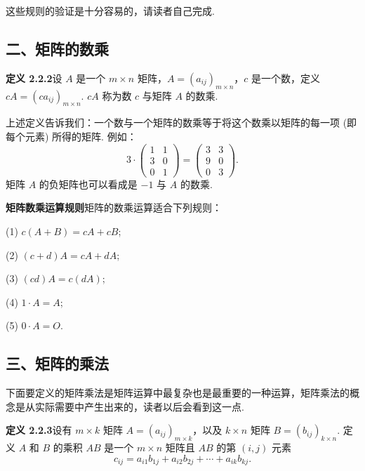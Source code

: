 \documentclass[UTF8, 12pt, fontset=fandol, oneside]{ctexart}
\begin{document}
这些规则的验证是十分容易的，请读者自己完成.

\subsection*{二、矩阵的数乘}

\noindent\textbf{定义 2.2.2}\quad 设 $A$ 是一个 $m\times n$ 矩阵，$A=(a_{ij})_{m\times n}$，$c$ 是一个数，定义 $cA=(ca_{ij})_{m\times n}$. $cA$ 称为数 $c$ 与矩阵 $A$ 的数乘.

上述定义告诉我们：一个数与一个矩阵的数乘等于将这个数乘以矩阵的每一项 (即每个元素) 所得的矩阵. 例如：
\[
3\cdot
\left(\begin{array}{cc}
1 & 1\\
3 & 0\\
0 & 1
\end{array}\right)
=
\left(\begin{array}{cc}
3 & 3\\
9 & 0\\
0 & 3
\end{array}\right).
\]
矩阵 $A$ 的负矩阵也可以看成是 $-1$ 与 $A$ 的数乘.

\noindent\textbf{矩阵数乘运算规则}\quad 矩阵的数乘运算适合下列规则：

(1) $c(A+B)=cA+cB$;

(2) $(c+d)A=cA+dA$;

(3) $(cd)A=c(dA)$;

(4) $1\cdot A=A$;

(5) $0\cdot A=O$.

\subsection*{三、矩阵的乘法}

下面要定义的矩阵乘法是矩阵运算中最复杂也是最重要的一种运算，矩阵乘法的概念是从实际需要中产生出来的，读者以后会看到这一点.

\noindent\textbf{定义 2.2.3}\quad 设有 $m\times k$ 矩阵 $A=(a_{ij})_{m\times k}$，以及 $k\times n$ 矩阵 $B=(b_{ij})_{k\times n}$. 定义 $A$ 和 $B$ 的乘积 $AB$ 是一个 $m\times n$ 矩阵且 $AB$ 的第 $(i,j)$ 元素
\[
c_{ij}=a_{i1}b_{1j}+a_{i2}b_{2j}+\cdots+a_{ik}b_{kj}.
\]
\end{document}
